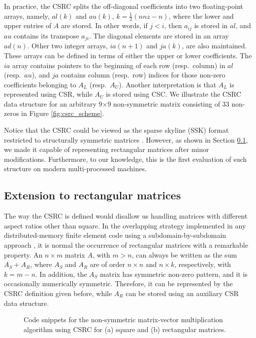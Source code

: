 \documentclass[11pt]{article}
\begin{document}
In practice, the CSRC splits the off-diagonal coefficients into two
floating-point arrays, namely, $al(k)$ and $au(k)$, $k = \frac{1}{2}(nnz - n)$,
where the lower and upper entries of $A$ are stored.  In other words, if $j <
i$, then $a_{ij}$ is stored in $al$, and $au$ contains its transpose $a_{ji}$.
The diagonal elements are stored in an array $ad(n)$.  Other two integer
arrays, $ia(n+1)$ and $ja(k)$, are also maintained. These arrays can be defined
in terms of either the upper or lower coefficients.  The $ia$ array
contains pointers to the beginning of each row (resp.~column) in $al$
(resp.~$au$), and $ja$ contains column (resp.~row) indices for those non-zero
coefficients belonging to $A_L$ (resp.~$A_U$).  Another
interpretation is that $A_L$ is represented using CSR, while $A_U$ is stored using
CSC.  We illustrate the CSRC data structure for an arbitrary 9$\times$9 non-symmetric matrix
consisting of 33 non-zeros in Figure \ref{fig:csrc_scheme}.

Notice that the CSRC could be viewed as the sparse skyline (SSK) format
restricted to structurally symmetric matrices \cite{Saa95a,GR01a}.
However, as shown in Section \ref{sec:rectextension}, we made it capable of
representing rectangular matrices after minor modifications.  Furthermore, to
our knowledge, this is the first evaluation of such structure on modern
multi-processed machines.

\subsection{Extension to rectangular matrices}
\label{sec:rectextension}

The way the CSRC is defined would disallow us handling matrices with different
aspect ratios other than square.  In the overlapping strategy
implemented in any distributed-memory finite element code using a 
subdomain-by-subdomain approach
\cite{RF07a,ARM09a}, it is normal the
occurrence of rectangular matrices with a remarkable property.
An $n \times m$ matrix $A$,
with $m > n$, can always be written as the sum $A_S + A_R$, where
$A_S$ and $A_R$ are of order $n \times n$ and $n \times k$, respectively, with
$k = m - n$.  In addition, the $A_S$ matrix has symmetric non-zero pattern, and
it is occasionally numerically symmetric.  Therefore, it can be represented by the
CSRC definition given before, while $A_R$ can be stored using an auxiliary CSR
data structure.

\begin{figure}[!t]
\centering
\subfloat[]{\label{fig:matvec_csrc}}
\hfil
\subfloat[]{\label{fig:matvec_csrcr}}
\caption{Code snippets for the non-symmetric matrix-vector multiplication
algorithm using CSRC for (a) square and
(b) rectangular matrices.}
\label{fig:SpMV}
\end{figure}
\end{document}
